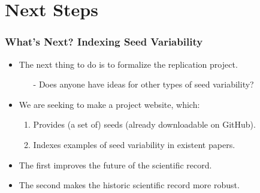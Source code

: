 \documentclass[12pt]{beamer}
\begin{document}
\section{Next Steps}
\begin{frame}
\frametitle{\color{myred}What's Next?{} \color{black} Indexing Seed Variability}
\begin{itemize}
\item The next thing to do is to formalize the replication project.\\ \vspace{.1in}
\begin{itemize}
\item[-] Does anyone have ideas for other types of seed variability?\\ \vspace{.1in}
\end{itemize}
\item We are seeking to make a project website, which:\\ \vspace{.1in}
\begin{enumerate}
\item Provides (a set of) seeds (already downloadable on GitHub).\\ \vspace{.1in}
\item Indexes examples of seed variability in existent papers.\\ \vspace{.1in}
\end{enumerate}
\item The first improves the future of the scientific record.\\ \vspace{.1in}
\item The second makes the historic scientific record more robust.\\ \vspace{.1in}
\end{itemize}
\end{frame}
\end{document}
